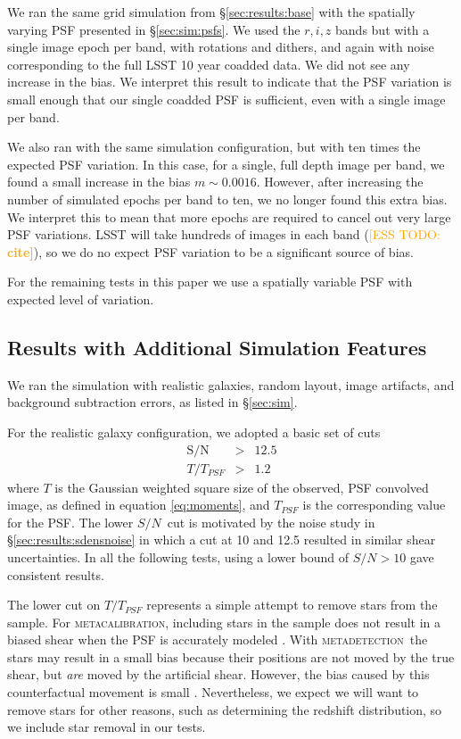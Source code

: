 \documentclass[twocolumn,twocolappendix,astrosym]{openjournal}
\newcommand{\esstodo}[1]{\textcolor{orange}{[ESS TODO: \bf #1]}}
\newcommand{\snr}{$S/N$}
\newcommand{\mcal}{\textsc{metacalibration}}
\newcommand{\mdet}{\textsc{metadetection}}
\begin{document}
We ran the same grid simulation from \S \ref{sec:results:base} with the
spatially varying PSF presented in \S \ref{sec:sim:psfs}. We used the $r, i, z$
bands but with a single image epoch per band, with rotations and dithers, and
again with noise corresponding to the full LSST 10 year coadded data.  We
did not see any increase in the bias.   We interpret this result to indicate
that the PSF variation is small enough that our single coadded PSF is
sufficient, even with a single image per band.

We also ran with the same simulation configuration, but with ten times the
expected PSF variation. In this case, for a single, full depth image per band,
we found a small increase in the bias $m \sim 0.0016$.  However, after
increasing the number of simulated epochs per band to ten, we no longer found
this extra bias.  We interpret this to mean that more epochs are required to
cancel out very large PSF variations.  LSST will take hundreds of images in
each band (\esstodo{cite}), so we do no expect PSF variation to be a
significant source of bias.

For the remaining tests in this paper we use a spatially variable PSF with
expected level of variation.

\subsection{Results with Additional Simulation Features} \label{sec:results:more}

We ran the simulation with realistic galaxies, random layout, image
artifacts, and background subtraction errors, as listed in \S \ref{sec:sim}.

For the realistic galaxy configuration, we adopted a basic set of cuts
\begin{eqnarray} \label{eq:basiccuts}
    \mathrm{S/N} & > & 12.5 \\
    T/T_{PSF} & > & 1.2
\end{eqnarray}
where $T$ is the Gaussian weighted square size of the observed, PSF convolved
image, as defined in equation \ref{eq:moments}, and $T_{PSF}$ is the
corresponding value for the PSF.  The lower \snr\ cut is motivated by the noise
study in \S \ref{sec:results:sdensnoise} in which a cut at 10 and 12.5 resulted
in similar shear uncertainties.  In all the following tests, using a lower
bound of $S/N > 10$ gave consistent results.

The lower cut on $T/T_{PSF}$ represents a simple attempt to remove stars from
the sample.  For \mcal, including stars in the sample does not result in a
biased shear when the PSF is accurately modeled \citep{SheldonMcal2017}.  With
\mdet\ the stars may result in a small bias because their positions are not
moved by the true shear, but {\it are} moved by the artificial shear. However, the bias
caused by this counterfactual movement is small \citep{mdet20}.  Nevertheless,
we expect we will want to remove stars for other reasons, such as determining
the redshift distribution, so we include star removal in our tests.
\end{document}
